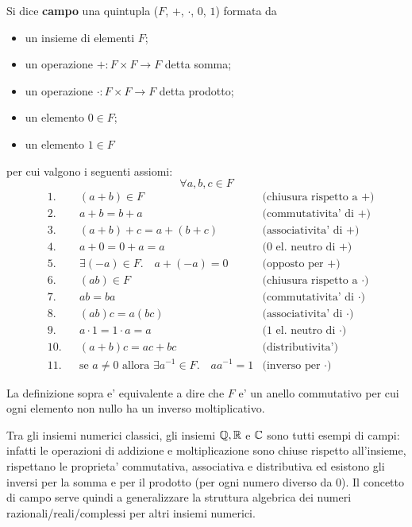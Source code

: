 \begin{definition}
    Si dice \textbf{campo} una quintupla ($F$, $+$, $\cdot$, $0$, $1$) formata da
    \begin{itemize}
        \item un insieme di elementi $F$;
        \item un operazione $+ : F \times F \to F$ detta somma;
        \item un operazione $\cdot : F \times F \to F$ detta prodotto;
        \item un elemento $0 \in F$;
        \item un elemento $1 \in F$
    \end{itemize}  per cui valgono i seguenti assiomi: \[
        \forall a, b, c \in F    
    \]
    \begin{align}
        &\text{1.}      &&(a+b) \in F           &\text{(chiusura rispetto a $+$)}\\
        &\text{2.}      &&a+b = b+a             &\text{(commutativita' di $+$)}\\
        &\text{3.}      &&(a+b)+c = a+(b+c)     &\text{(associativita' di $+$)}\\
        &\text{4.}      &&a+0=0+a=a             &\text{(0 el. neutro di $+$)}\\
        &\text{5.}      &&\exists (-a) \in F. \quad a+(-a) = 0 &\text{(opposto per $+$)}\\
        &\text{6.}      &&(ab) \in F            &\text{(chiusura rispetto a $\cdot$)}\\        
        &\text{7.}      &&ab = ba               &\text{(commutativita' di $\cdot$)}\\
        &\text{8.}      &&(ab)c = a(bc)         &\text{(associativita' di $\cdot$)}\\
        &\text{9.}      &&a \cdot 1=1 \cdot a=a &\text{(1 el. neutro di $\cdot$)}\\
        &\text{10.}     &&(a+b)c = ac + bc      &\text{(distributivita')} \\
        &\text{11.}     &&\text{se } a \neq 0 \text{ allora } \exists a^{-1} \in F. \quad aa^{-1} = 1 &\text{(inverso per $\cdot$)}
    \end{align}

    La definizione sopra e' equivalente a dire che $F$ e' un anello commutativo per cui ogni elemento non nullo ha un inverso moltiplicativo.
\end{definition}

Tra gli insiemi numerici classici, gli insiemi $\mathbb{Q}, \mathbb{R}$ e $\mathbb{C}$ sono tutti esempi di campi: infatti le operazioni di addizione e moltiplicazione sono chiuse rispetto all'insieme, rispettano le proprieta' commutativa, associativa e distributiva ed esistono gli inversi per la somma e per il prodotto (per ogni numero diverso da $0$). Il concetto di campo serve quindi a generalizzare la struttura algebrica dei numeri razionali/reali/complessi per altri insiemi numerici.
